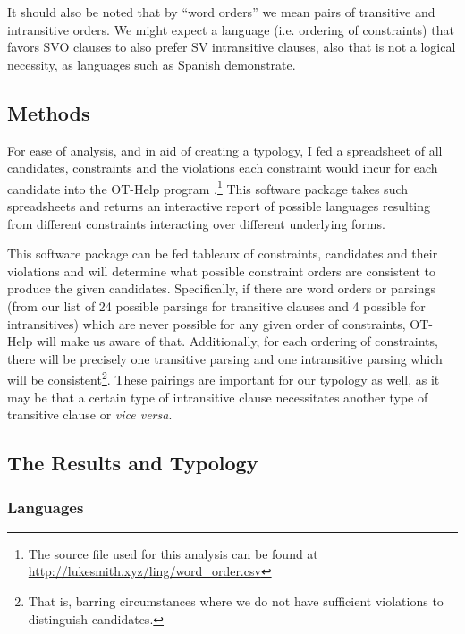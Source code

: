 \documentclass{article}
\begin{document}
It should also be noted that by ``word orders'' we mean pairs of transitive and intransitive orders.
We might expect a language (i.e. ordering of constraints) that favors SVO clauses to also prefer SV intransitive clauses, also that is not a logical necessity, as languages such as Spanish demonstrate.

\subsection{Methods}

For ease of analysis, and in aid of creating a typology, I fed a spreadsheet of all candidates, constraints and the violations each constraint would incur for each candidate into the OT-Help program \parencite{othelp}.\footnote{The source file used for this analysis can be found at \href{http://lukesmith.xyz/ling/word_order.csv}{http://lukesmith.xyz/ling/word\_order.csv}} This software package takes such spreadsheets and returns an interactive report of possible languages resulting from different constraints interacting over different underlying forms.

This software package can be fed tableaux of constraints, candidates and their violations and will determine what possible constraint orders are consistent to produce the given candidates.
Specifically, if there are word orders or parsings (from our list of 24 possible parsings for transitive clauses and 4 possible for intransitives) which are never possible for any given order of constraints, OT-Help will make us aware of that.
Additionally, for each ordering of constraints, there will be precisely one transitive parsing and one intransitive parsing which will be consistent\footnote{That is, barring circumstances where we do not have sufficient violations to distinguish candidates.}.
These pairings are important for our typology as well, as it may be that a certain type of intransitive clause necessitates another type of transitive clause or \textit{vice versa}.

\subsection{The Results and Typology}

\subsubsection{Languages}

\newcommand{\no}{\textcolor{gray}}
\end{document}
